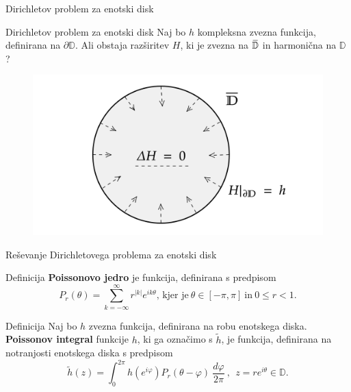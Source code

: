 \documentclass{beamer}
\newcommand{\overbar}[1]{\mkern 1.5mu\overline{\mkern-1.5mu#1\mkern-1.5mu}\mkern 1.5mu}
\theoremstyle{definition}
\theoremstyle{definition}
\begin{document}
\begin{frame}{Dirichletov problem za enotski disk}
    \begin{exampleblock}{Dirichletov problem za enotski disk}
        Naj bo $h$ kompleksna zvezna funkcija, definirana na $\partial \mathbb{D}$. 
        Ali obstaja razširitev $H$, ki je zvezna na $\overbar{\mathbb{D}}$ in harmonična na $\mathbb{D}$?
    \end{exampleblock}
    \begin{figure}
    \begin{center}
      \includegraphics[width=0.8 \textwidth]{dirichlet_form.png}
    \end{center}
    \end{figure}
\end{frame}

\begin{frame}{Reševanje Dirichletovega problema za enotski disk}
    \begin{block}{Definicija}
        \textbf{Poissonovo jedro} je funkcija, definirana s predpisom
        $$
           P_r(\theta) = \sum_{k = -\infty}^{\infty}{r^{|k|} e^{i k \theta}}\text{, kjer je}~\theta \in [-\pi, \pi]~\text{in}~ 0 \leq r < 1.
        $$
    \end{block}
    \pause
    \begin{block}{Definicija}
        Naj bo $h$ zvezna funkcija, definirana na robu enotskega diska.
        \textbf{Poissonov integral} funkcije $h$, ki ga označimo s $\widetilde{h}$, je funkcija, definirana na notranjosti enotskega diska s predpisom
        $$
        \widetilde{h}(z) = \int_{0}^{2\pi}{h(e^{i\varphi}) P_r(\theta - \varphi)~\frac{d\varphi}{2 \pi}}~,~~z = r e^{i\theta} \in \mathbb{D}.
        $$
    \end{block}
\end{frame}
\end{document}
